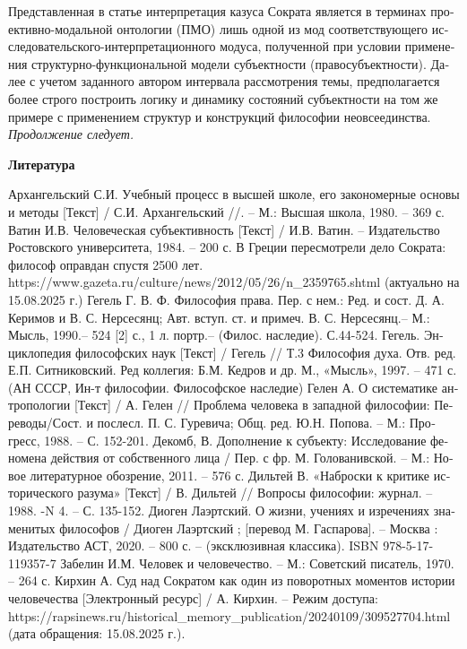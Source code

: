 \begin{russian}
    Представленная в статье интерпретация казуса Сократа является в терминах проективно-модальной онтологии (ПМО) лишь одной из мод соответствующего исследовательского-интерпретационного модуса, полученной при условии применения структурно-функциональной модели субъектности (правосубъектности). Далее с учетом заданного автором интервала рассмотрения темы, предполагается более строго построить логику и динамику состояний субъектности на том же примере с применением структур и конструкций философии неовсеединства.
    \textit{ Продолжение следует.} 

    {\centering \textbf{Литература} \par}
    Архангельский С.И. Учебный процесс в высшей школе, его закономерные основы и методы [Текст] / С.И. Архангельский //. – М.: Высшая школа, 1980. – 369 с.
    Ватин И.В. Человеческая субъективность [Текст] / И.В. Ватин. – Издательство Ростовского университета, 1984. – 200 с.
    В Греции пересмотрели дело Сократа: философ оправдан спустя 2500 лет. https://www.gazeta.ru/culture/news/2012/05/26/n_2359765.shtml (актуально на 15.08.2025 г.)
    Гегель Г. В. Ф. Философия права. Пер. с нем.: Ред. и сост. Д. А. Керимов и В. С. Нерсесянц; Авт. вступ. ст. и примеч. В. С. Нерсесянц.– М.: Мысль, 1990.– 524 [2] с., 1 л. портр.– (Филос. наследие). С.44-524.
    Гегель. Энциклопедия философских наук [Текст] / Гегель // Т.3 Философия духа. Отв. ред. Е.П. Ситниковский. Ред коллегия: Б.М. Кедров и др. М., «Мысль», 1997. –  471 с. (АН СССР, Ин-т философии. Философское наследие)
    Гелен А. О систематике антропологии [Текст] / А. Гелен // Проблема человека в западной философии: Переводы/Сост. и послесл. П. С. Гуревича; Общ. ред. Ю.Н. Попова. – М.: Прогресс, 1988. – С. 152-201.
    Декомб, В. Дополнение к субъекту: Исследование феномена действия от собственного лица / Пер. с фр. М. Голованивской. – М.: Новое литературное обозрение, 2011. – 576 с.
    Дильтей В. «Наброски к критике исторического разума» [Текст] / В. Дильтей // Вопросы философии: журнал. – 1988. -N 4. – С. 135-152.
    Диоген Лаэртский. О жизни, учениях и изречениях знаменитых философов / Диоген Лаэртский ; [перевод М. Гаспарова]. – Москва : Издательство АСТ, 2020. – 800 с. – (эксклюзивная классика). ISBN 978-5-17-119357-7
    Забелин И.М. Человек и человечество. – М.: Советский  писатель,  1970. –  264  с.
    Кирхин А. Суд над Сократом как один из поворотных моментов истории человечества [Электронный ресурс] / А. Кирхин. – Режим доступа: https://rapsinews.ru/historical_memory_publication/20240109/309527704.html (дата обращения: 15.08.2025 г.). 

\end{russian}
